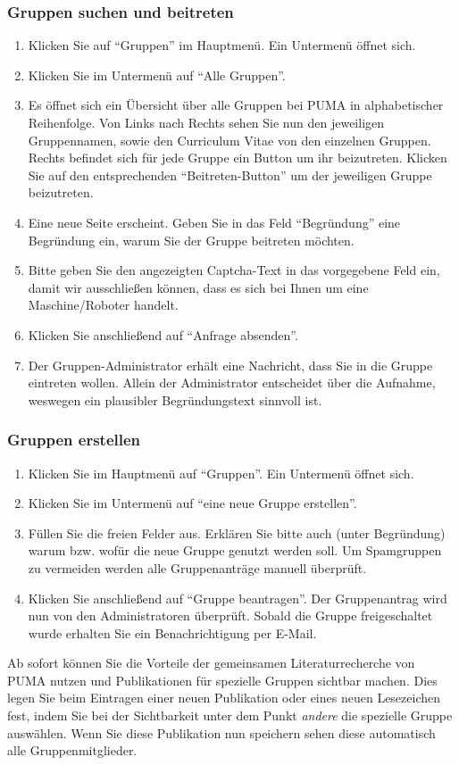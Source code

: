 \documentclass[a4paper,11pt,twoside]{scrbook}
\begin{document}
\subsubsection{Gruppen suchen und beitreten}%
\begin{enumerate}
    \item Klicken Sie auf \enquote{Gruppen} im Hauptmenü. Ein Untermenü öffnet sich.
    \item Klicken Sie im Untermenü auf \enquote{Alle Gruppen}.
    \item Es öffnet sich ein Übersicht über alle Gruppen bei PUMA in alphabetischer Reihenfolge. Von Links nach Rechts sehen Sie nun den jeweiligen Gruppennamen, sowie den Curriculum Vitae von den einzelnen Gruppen. Rechts befindet sich für jede Gruppe ein Button um ihr beizutreten. Klicken Sie auf den entsprechenden  \enquote{Beitreten-Button} um der jeweiligen Gruppe beizutreten.
    \item Eine neue Seite erscheint. Geben Sie in das Feld \enquote{Begründung} eine Begründung ein, warum Sie der Gruppe beitreten möchten.
    \item Bitte geben Sie den angezeigten Captcha-Text in das vorgegebene Feld ein, damit wir ausschließen können, dass es sich bei Ihnen um eine Maschine/Roboter handelt.
    \item Klicken Sie anschließend auf \enquote{Anfrage absenden}.
    \item Der Gruppen-Administrator erhält eine Nachricht, dass Sie in die Gruppe eintreten wollen. Allein der Administrator entscheidet über die Aufnahme, weswegen ein plausibler Begründungstext sinnvoll ist.
\end{enumerate}
\subsubsection{Gruppen erstellen}
\begin{enumerate}
    \item Klicken Sie im Hauptmenü auf \enquote{Gruppen}. Ein Untermenü öffnet sich.
    \item Klicken Sie im Untermenü auf \enquote{eine neue Gruppe erstellen}.
    \item Füllen Sie die freien Felder aus. Erklären Sie bitte auch (unter Begründung) warum bzw. wofür die neue Gruppe genutzt werden soll.   Um Spamgruppen zu vermeiden werden alle Gruppenanträge manuell überprüft. 
    \item Klicken Sie anschließend auf \enquote{Gruppe beantragen}. Der Gruppenantrag wird nun von den Administratoren überprüft. Sobald die Gruppe freigeschaltet wurde erhalten Sie ein Benachrichtigung per E-Mail.
\end{enumerate}
Ab sofort können Sie die Vorteile der gemeinsamen Literaturrecherche von PUMA nutzen und Publikationen  für spezielle Gruppen sichtbar machen. Dies legen Sie beim Eintragen einer neuen Publikation oder eines neuen Lesezeichen fest, indem Sie bei der Sichtbarkeit unter dem Punkt \textit{andere} die spezielle Gruppe auswählen. Wenn Sie diese Publikation nun speichern sehen diese automatisch alle Gruppenmitglieder.
\end{document}
